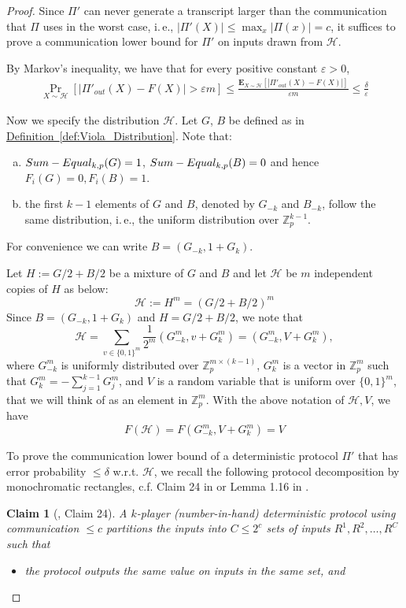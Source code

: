 \documentclass[11pt]{article}
\numberwithin{equation}{section}
\newtheorem{claim}[theorem]{Claim}
\theoremstyle{definition}
\theoremstyle{plain}
\newcommand{\Z}{\mathbb Z}
\newcommand{\ie}{i.\,e.}
\newcommand{\expref}[2]{\hyperref[#2]{#1~\ref{#2}}}
\newcommand{\follows}{\ensuremath{\sim}}
\newcommand{\zo}{\ensuremath{ \{ 0, 1 \} }}
\newcommand{\error}{\ensuremath{\delta}}
\newcommand{\gap}{\ensuremath{\varepsilon}}
\newcommand{\eqdef}{\ensuremath{:=}}
\newcommand{\E}{\ensuremath{\mathbf{E}}}
\newcommand{\sumequal}{\textsc{Sum-Equal} }
\begin{document}
\begin{proof}
		Since $\Pi'$ can never generate a transcript larger than the communication that $\Pi$ uses in the worst case, \ie, $|\Pi'(X)| \le  \max_x |\Pi(x)| =c$,
		it suffices to prove a communication lower bound for $\Pi'$ on inputs drawn from $\mathcal{H}$. 


		By Markov's inequality, we have that for every positive constant $\gap>0$,
		\begin{align}\label{ineq:Pi'}
		\Pr_{X\follows \mathcal{H}}\left[ \left| \Pi'_{out}(X) - F(X)\right| > \gap m \right] \le \frac{\E_{X\follows \mathcal{H}}\left[ \left| \Pi'_{out}(X) - F(X)\right| \right]}{\gap m}\le \frac{\error}{\gap}
		\end{align}



		Now we specify the distribution $\mathcal{H}$.
%
		Let $G$, $B$ be defined as in \expref{Definition}{def:Viola_Distribution}.	Note that:
%
%
\begin{enumerate}[(a)]  %
\item $\sumequal_{k,p}(G)=1$, $\sumequal_{k,p}(B)=0$ and hence $F_i(G)=0, F_i(B)=1$.
\item the first $k-1$ elements of $G$ and $B$, denoted by $G_{-k}$ and $B_{-k}$, follow the same distribution, \ie, the uniform distribution over $\Z_p^{k-1}$.
\end{enumerate}
%
%
		For convenience we can write $B=(G_{-k},1+G_k)$.

		Let $H\eqdef G/2+B/2$ be a mixture of $G$ and $B$ and let $\mathcal{H}$ be $m$ independent copies of $H$ as below:
		\[\mathcal{H} \eqdef H^m = \left(G/2+B/2\right)^m\]
		Since $B=(G_{-k},1+G_k)$ and $H=G/2+B/2$, we note that
		\[\mathcal{H} = \sum_{v\in\zo^m} \frac{1}{2^m} (G^m_{-k}, v+G^m_k)=(G^m_{-k}, V+G^m_k),\]
		where $G^m_{-k}$ is uniformly distributed over $\Z_p^{m\times (k-1)}$, $G_k^m$ is a vector in $\Z_p^m$ such that $G_k^m=-\sum_{j=1}^{k-1} G^m_j$, and $V$ is a random variable that is uniform over $\zo^m$, that we will think of as an element in  $\Z_p^m$.
		With the above notation of $\mathcal{H}, V$, we have
		\[F(\mathcal{H})=F(G^m_{-k}, V+G^m_k)=V\]

		To prove the communication lower bound of a deterministic protocol $\Pi'$ that has error probability $\le \error$ w.r.t. $\mathcal{H}$, 
		we recall the following protocol decomposition by monochromatic rectangles, c.f. Claim 24 in  \cite{Viola:2013we}  or Lemma 1.16 in \cite{kushilevitz1997communication}.

		\begin{claim}[\cite{Viola:2013we}, Claim 24]\label{claim: rectangle}
		A $k$-player (number-in-hand) deterministic protocol using communication $\le c$ partitions the inputs into $C\le 2^c $ sets of inputs $R^1,R^2,\ldots, R^C$ such that
			\begin{itemize}
				\item the protocol outputs the same value on inputs in the same set, and


\end{itemize}
\end{claim}
\end{proof}
\end{document}
